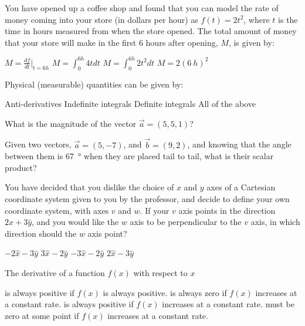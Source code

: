 \question You have opened up a coffee shop and found that you can model the rate of money coming into your store (in dollars per hour) as $f(t) = 2t^2$, where $t$ is the time in hours measured from when the store opened. The total amount of money that your store will make in the first 6 hours after opening, $M$, is given by:
\begin{checkboxes}
\choice $M=\frac{df}{dt}\big|_{t=6h}$
\choice $M=\int_{0}^{6h}4t dt$
\CorrectChoice $M=\int_{0}^{6h}2t^2 dt$ \correct
\choice $M=2(\SI{6}{h})^2$
\end{checkboxes}

\question Physical (measurable) quantities can be given by:
\begin{checkboxes}
\choice Anti-derivatives
\choice Indefinite integrals
\CorrectChoice Definite integrals \correct
\choice All of the above
\end{checkboxes}

\question What is the magnitude of the vector $\vec a = (5,5,1)$?
\begin{checkboxes}
\end{checkboxes}

\question Given two vectors,  $\vec a = (5, -7)$, and $\vec b = (9, 2)$, and knowing that the angle between them is \SI{67}{\degree} when they are placed tail to tail, what is their scalar product?
\begin{checkboxes}
\end{checkboxes}

\question You have decided that you dislike the choice of $x$ and $y$ axes of a Cartesian coordinate system given to you by the professor, and decide to define your own coordinate system, with axes $v$ and $w$. If your $v$ axis points in the direction $2\hat x+3\hat y$, and you would like the $w$ axis to be perpendicular to the $v$ axis, in which direction should the $w$ axis point?
\begin{checkboxes}
\choice $-2\hat x-3\hat y$
\CorrectChoice $3\hat x-2\hat y$
\choice $-3\hat x-2\hat y$
\choice $2\hat x-3\hat y$
\end{checkboxes}

\question The derivative of a function $f(x)$ with respect to $x$
\begin{checkboxes}
\choice is always positive if $f(x)$ is always positive.
\choice is always zero if $f(x)$ increases at a constant rate.
\CorrectChoice is always positive if $f(x)$ increases at a constant rate.
\choice must be zero at some point if $f(x)$ increases at a constant rate.
\end{checkboxes}

